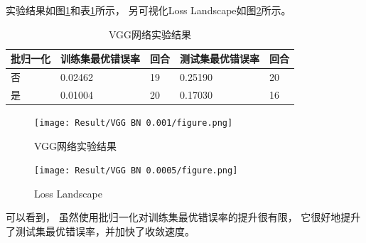 \documentclass{article}
\begin{document}
实验结果如图\ref{fig:VGG}和表\ref{table:VGG}所示，
另可视化Loss Landscape如图\ref{fig:VGGLL}所示。

\begin{table}[h]
\centering
\begin{tabular}{|l|l|l|l|l|} 
\hline
批归一化 & 训练集最优错误率 & 回合 & 测试集最优错误率 & 回合 \\
\hline
否 & 0.02462 & 19 & 0.25190 & 20 \\
是 & 0.01004 & 20 & 0.17030 & 16 \\
\hline
\end{tabular}
\caption{VGG网络实验结果}
\label{table:VGG}
\end{table}

\begin{figure}[h]
\texttt{[image: Result/VGG BN 0.001/figure.png]}
\caption{VGG网络实验结果}
\label{fig:VGG}
\end{figure}

\begin{figure}[h]
\texttt{[image: Result/VGG BN 0.0005/figure.png]}
\caption{Loss Landscape}
\label{fig:VGGLL}
\end{figure}

可以看到，
虽然使用批归一化对训练集最优错误率的提升很有限，
它很好地提升了测试集最优错误率，并加快了收敛速度。
\end{document}
